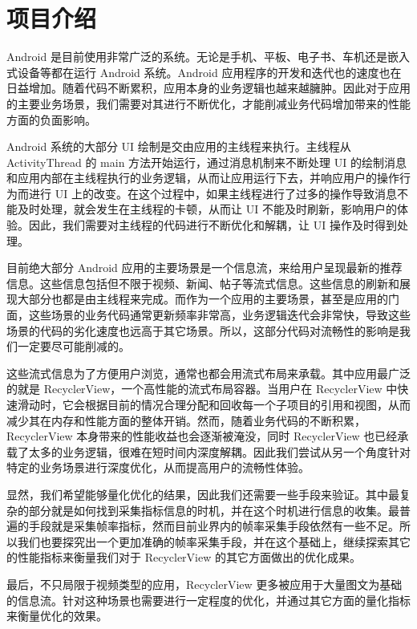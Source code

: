 \chapter{项目介绍}

Android 是目前使用非常广泛的系统\cite{businge2019studying}。无论是手机、平板、电子书、车机还是嵌入式设备等都在运行 Android 系统。Android 应用程序的开发和迭代也的速度也在日益增加。随着代码不断累积，应用本身的业务逻辑也越来越臃肿。因此对于应用的主要业务场景，我们需要对其进行不断优化，才能削减业务代码增加带来的性能方面的负面影响。

Android 系统的大部分 UI 绘制是交由应用的主线程来执行\cite{yan2014real}。主线程从 ActivityThread 的 main 方法开始运行，通过消息机制来不断处理 UI 的绘制消息和应用内部在主线程执行的业务逻辑，从而让应用运行下去，并响应用户的操作行为而进行 UI 上的改变。在这个过程中，如果主线程进行了过多的操作导致消息不能及时处理，就会发生在主线程的卡顿，从而让 UI 不能及时刷新，影响用户的体验。因此，我们需要对主线程的代码进行不断优化和解耦，让 UI 操作及时得到处理。

目前绝大部分 Android 应用的主要场景是一个信息流，来给用户呈现最新的推荐信息。这些信息包括但不限于视频、新闻、帖子等流式信息。这些信息的刷新和展现大部分也都是由主线程来完成。而作为一个应用的主要场景，甚至是应用的门面，这些场景的业务代码通常更新频率非常高，业务逻辑迭代会非常快，导致这些场景的代码的劣化速度也远高于其它场景。所以，这部分代码对流畅性的影响是我们一定要尽可能削减的。

这些流式信息为了方便用户浏览，通常也都会用流式布局来承载。其中应用最广泛的就是 RecyclerView，一个高性能的流式布局容器\cite{sabiyath2020enhanced}。当用户在 RecyclerView 中快速滑动时，它会根据目前的情况合理分配和回收每一个子项目的引用和视图，从而减少其在内存和性能方面的整体开销。然而，随着业务代码的不断积累，RecyclerView 本身带来的性能收益也会逐渐被淹没，同时 RecyclerView 也已经承载了太多的业务逻辑，很难在短时间内深度解耦。因此我们尝试从另一个角度针对特定的业务场景进行深度优化，从而提高用户的流畅性体验。

显然，我们希望能够量化优化的结果，因此我们还需要一些手段来验证。其中最复杂的部分就是如何找到采集指标信息的时机，并在这个时机进行信息的收集。最普遍的手段就是采集帧率指标，然而目前业界内的帧率采集手段依然有一些不足。所以我们也要探究出一个更加准确的帧率采集手段，并在这个基础上，继续探索其它的性能指标来衡量我们对于 RecyclerView 的其它方面做出的优化成果。

最后，不只局限于视频类型的应用，RecyclerView 更多被应用于大量图文为基础的信息流。针对这种场景也需要进行一定程度的优化，并通过其它方面的量化指标来衡量优化的效果。